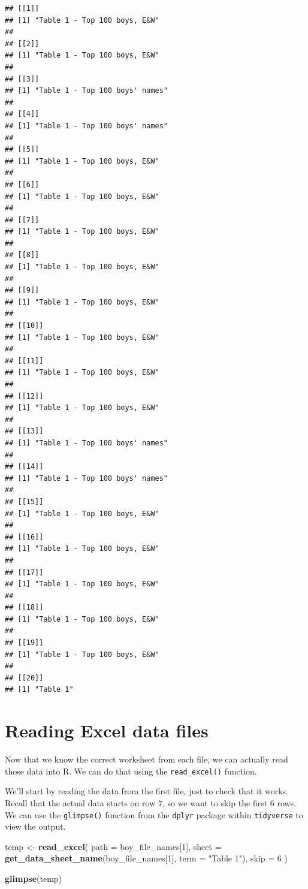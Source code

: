 \documentclass[
]{book}
\newenvironment{Shaded}{\begin{snugshade}}{\end{snugshade}}
\newcommand{\DataTypeTok}[1]{\textcolor[rgb]{0.13,0.29,0.53}{#1}}
\newcommand{\DecValTok}[1]{\textcolor[rgb]{0.00,0.00,0.81}{#1}}
\newcommand{\KeywordTok}[1]{\textcolor[rgb]{0.13,0.29,0.53}{\textbf{#1}}}
\newcommand{\NormalTok}[1]{#1}
\newcommand{\StringTok}[1]{\textcolor[rgb]{0.31,0.60,0.02}{#1}}
\begin{document}
\begin{verbatim}
## [[1]]
## [1] "Table 1 - Top 100 boys, E&W"
## 
## [[2]]
## [1] "Table 1 - Top 100 boys, E&W"
## 
## [[3]]
## [1] "Table 1 - Top 100 boys' names"
## 
## [[4]]
## [1] "Table 1 - Top 100 boys' names"
## 
## [[5]]
## [1] "Table 1 - Top 100 boys, E&W"
## 
## [[6]]
## [1] "Table 1 - Top 100 boys, E&W"
## 
## [[7]]
## [1] "Table 1 - Top 100 boys, E&W"
## 
## [[8]]
## [1] "Table 1 - Top 100 boys, E&W"
## 
## [[9]]
## [1] "Table 1 - Top 100 boys, E&W"
## 
## [[10]]
## [1] "Table 1 - Top 100 boys, E&W"
## 
## [[11]]
## [1] "Table 1 - Top 100 boys, E&W"
## 
## [[12]]
## [1] "Table 1 - Top 100 boys, E&W"
## 
## [[13]]
## [1] "Table 1 - Top 100 boys' names"
## 
## [[14]]
## [1] "Table 1 - Top 100 boys' names"
## 
## [[15]]
## [1] "Table 1 - Top 100 boys, E&W"
## 
## [[16]]
## [1] "Table 1 - Top 100 boys, E&W"
## 
## [[17]]
## [1] "Table 1 - Top 100 boys, E&W"
## 
## [[18]]
## [1] "Table 1 - Top 100 boys, E&W"
## 
## [[19]]
## [1] "Table 1 - Top 100 boys, E&W"
## 
## [[20]]
## [1] "Table 1"
\end{verbatim}

\hypertarget{reading-excel-data-files}{%
\section{Reading Excel data files}\label{reading-excel-data-files}}

Now that we know the correct worksheet from each file, we can actually
read those data into R. We can do that using the \texttt{read\_excel()} function.

We'll start by reading the data from the first file, just to check
that it works. Recall that the actual data starts on row 7, so we want
to skip the first 6 rows. We can use the \texttt{glimpse()} function from
the \texttt{dplyr} package within \texttt{tidyverse} to view the output.

\begin{Shaded}
\begin{Highlighting}[]
\NormalTok{temp \textless{}{-}}\StringTok{ }\KeywordTok{read\_excel}\NormalTok{(}
  \DataTypeTok{path =}\NormalTok{ boy\_file\_names[}\DecValTok{1}\NormalTok{],}
  \DataTypeTok{sheet =} \KeywordTok{get\_data\_sheet\_name}\NormalTok{(boy\_file\_names[}\DecValTok{1}\NormalTok{], }\DataTypeTok{term =} \StringTok{"Table 1"}\NormalTok{),}
  \DataTypeTok{skip =} \DecValTok{6}
\NormalTok{)}

\KeywordTok{glimpse}\NormalTok{(temp)}
\end{Highlighting}
\end{Shaded}
\end{document}
